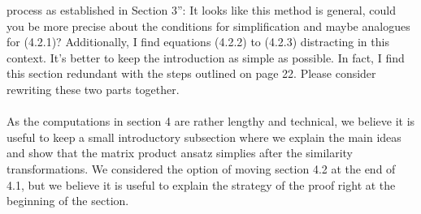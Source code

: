 \documentclass[10pt]{article}
\numberwithin{equation}{section}
\numberwithin{equation}{subsection}
\begin{document}
\begin{enumerate}
{							process as established in Section 3”: It looks like this method is general, could you be more precise
							about the conditions for simplification and maybe analogues for (4.2.1)? Additionally, I find equations
							(4.2.2) to (4.2.3) distracting in this context. It’s better to keep the introduction as simple as possible.
							In fact, I find this section redundant with the steps outlined on page 22. Please consider rewriting
							these two parts together.}\\ \\ 	As the computations in section 4 are rather lengthy and technical, we believe it is useful to keep a small introductory subsection where we explain the main ideas and show that the matrix product ansatz simplies after the similarity transformations.
							We considered the option of moving section 4.2 at the end of 4.1, but we believe it is useful to explain the strategy of the proof right at the beginning of the section.							
		\end{enumerate}
\end{document}
